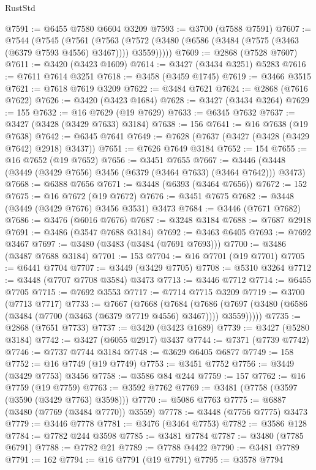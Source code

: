 \begin{lexlean}{RustStd}
\begin{coremodule}
{\begin{coremodule}
{{{{{{{{{{{{{{{{{{{{{{{{{{{{{{{{{{{{{{{{{{{{{{{{{{{{{{{{{{{{{{{{{{{{{{{{{{{{{{{{{{{{{@7591 := @6455 @7580 @6604 @3209
@7593 := @3700 (@7588 @7591)
@7607 := @7544
    (@7545
      (@7561
        (@7563 (@7572 (@3480 (@6586 (@3484 (@7575 (@3463 (@6379 @7593 @4556) @3467)))) @3559)))))
@7609 := @2868 (@7528 @7607)
@7611 := @3420 (@3423 @1609)
@7614 := @3427 (@3434 @3251) @5283
@7616 := @7611 @7614 @3251
@7618 := @3458 (@3459 @1745)
@7619 := @3466 @3515
@7621 := @7618 @7619 @3209
@7622 := @3484 @7621
@7624 := @2868 (@7616 @7622)
@7626 := @3420 (@3423 @1684)
@7628 := @3427 (@3434 @3264)
@7629 := 155
@7632 := @16 @7629 (@19 @7629)
@7633 := @6345 @7632
@7637 := @3427 (@3428 (@3429 @7633) @3184)
@7638 := 156
@7641 := @16 @7638 (@19 @7638)
@7642 := @6345 @7641
@7649 := @7628 (@7637 (@3427 (@3428 (@3429 @7642) @2918) @3437))
@7651 := @7626 @7649 @3184
@7652 := 154
@7655 := @16 @7652 (@19 @7652)
@7656 := @3451 @7655
@7667 := @3446 (@3448 (@3449 (@3429 @7656) @3456 (@6379 (@3464 @7633) (@3464 @7642))) @3473)
@7668 := @6388 @7656
@7671 := @3448 (@6393 (@3464 @7656))
@7672 := 152
@7675 := @16 @7672 (@19 @7672)
@7676 := @3451 @7675
@7682 := @3448 (@3449 (@3429 @7676) @3456 @3531) @3473
@7684 := @3446 (@7671 @7682)
@7686 := @3476 (@6016 @7676)
@7687 := @3248 @3184
@7688 := @7687 @2918
@7691 := @3486 (@3547 @7688 @3184)
@7692 := @3463 @6405
@7693 := @7692 @3467
@7697 := @3480 (@3483 (@3484 (@7691 @7693)))
@7700 := @3486 (@3487 @7688 @3184)
@7701 := 153
@7704 := @16 @7701 (@19 @7701)
@7705 := @6441 @7704
@7707 := @3449 (@3429 @7705)
@7708 := @5310 @3264
@7712 := @3448 (@7707 @7708 @3584) @3473
@7713 := @3446 @7712
@7714 := @6455 @7705
@7715 := @7692 @3553
@7717 := @7714 @7715 @3209
@7719 := @3700 (@7713 @7717)
@7733 := @7667
    (@7668
      (@7684
        (@7686 (@7697 (@3480 (@6586 (@3484 (@7700 (@3463 (@6379 @7719 @4556) @3467)))) @3559)))))
@7735 := @2868 (@7651 @7733)
@7737 := @3420 (@3423 @1689)
@7739 := @3427 (@5280 @3184)
@7742 := @3427 (@6055 @2917) @3437
@7744 := @7371 (@7739 @7742)
@7746 := @7737 @7744 @3184
@7748 := @3629 @6405 @6877
@7749 := 158
@7752 := @16 @7749 (@19 @7749)
@7753 := @3451 @7752
@7756 := @3449 (@3429 @7753) @3456
@7758 := @3586 @84 @244
@7759 := 157
@7762 := @16 @7759 (@19 @7759)
@7763 := @3592 @7762
@7769 := @3481 (@7758 (@3597 (@3590 (@3429 @7763) @3598)))
@7770 := @5086 @7763
@7775 := @6887 (@3480 (@7769 (@3484 @7770)) @3559)
@7778 := @3448 (@7756 @7775) @3473
@7779 := @3446 @7778
@7781 := @3476 (@3464 @7753)
@7782 := @3586 @128
@7784 := @7782 @244 @3598
@7785 := @3481 @7784
@7787 := @3480 (@7785 @6791)
@7788 := @7782 @21
@7789 := @7788 @4422
@7790 := @3481 @7789
@7791 := 162
@7794 := @16 @7791 (@19 @7791)
@7795 := @3578 @7794
}}}}}}}}}}}}}}}}}}}}}}}}}}}}}}}}}}}}}}}}}}}}}}}}}}}}}}}}}}}}}}}}}}}}}}}}}}}}}}}}}}}}}
\end{coremodule}}
\end{coremodule}
\end{lexlean}
